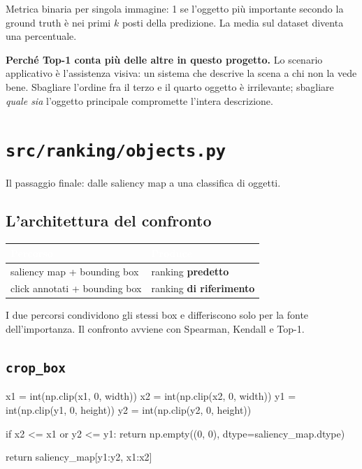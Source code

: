 Metrica binaria per singola immagine: 1 se l'oggetto più importante secondo la ground truth è nei
primi $k$ posti della predizione. La media sul dataset diventa una percentuale.

\begin{nota}
\textbf{Perché Top-1 conta più delle altre in questo progetto.} Lo scenario applicativo è
l'assistenza visiva: un sistema che descrive la scena a chi non la vede bene. Sbagliare l'ordine
fra il terzo e il quarto oggetto è irrilevante; sbagliare \emph{quale sia} l'oggetto principale
compromette l'intera descrizione.
\end{nota}

\section{\texttt{src/ranking/objects.py}}

Il passaggio finale: dalle saliency map a una classifica di oggetti.

\subsection{L'architettura del confronto}

\begin{center}
\begin{tabular}{l l}
\toprule
\rowcolor{tblHead}\textcolor{white}{\textbf{Percorso}} & \textcolor{white}{\textbf{Produce}} \\
\midrule
saliency map + bounding box & ranking \textbf{predetto} \\
\rowcolor{tblAlt} click annotati + bounding box & ranking \textbf{di riferimento} \\
\bottomrule
\end{tabular}
\end{center}

I due percorsi condividono gli stessi box e differiscono solo per la fonte dell'importanza. Il
confronto avviene con Spearman, Kendall e Top-1.

\subsection{\texttt{crop\_box}}

\begin{idebox}
\begin{pycode}
x1 = int(np.clip(x1, 0, width))
x2 = int(np.clip(x2, 0, width))
y1 = int(np.clip(y1, 0, height))
y2 = int(np.clip(y2, 0, height))

if x2 <= x1 or y2 <= y1:
    return np.empty((0, 0), dtype=saliency_map.dtype)

return saliency_map[y1:y2, x1:x2]
\end{pycode}
\end{idebox}


